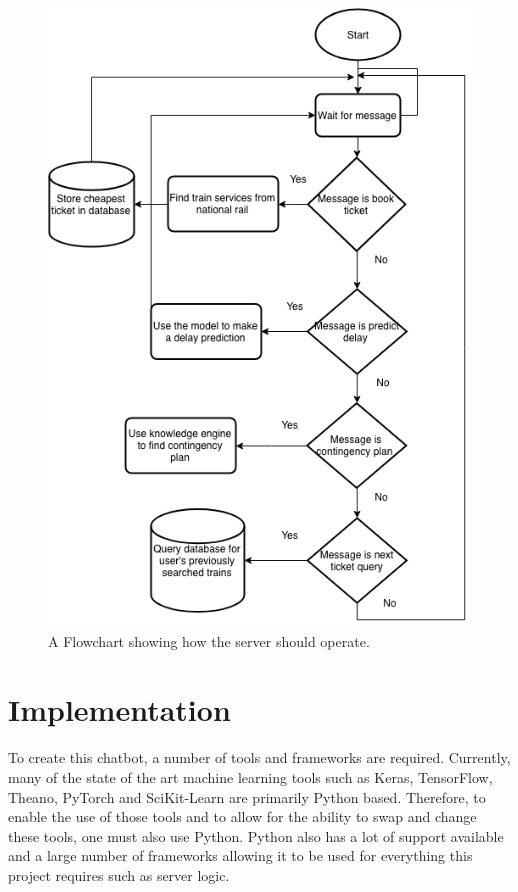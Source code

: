 \documentclass[12pt,a4paper]{article}
\begin{document}
    \begin{figure}[H]
        \centering
        \includegraphics[scale=0.7]{Images/server_flowchart.png}
        \caption{A Flowchart showing how the server should operate.}
        \label{fig:server_flowchat}
    \end{figure}
    
    \section{Implementation}
    
    To create this chatbot, a number of tools and frameworks are required. Currently, many of the state of the art machine learning tools such as Keras, TensorFlow, Theano, PyTorch and SciKit-Learn are primarily Python based. Therefore, to enable the use of those tools and to allow for the ability to swap and change these tools, one must also use Python. Python also has a lot of support available and a large number of frameworks allowing it to be used for everything this project requires such as server logic.
    
\end{document}
